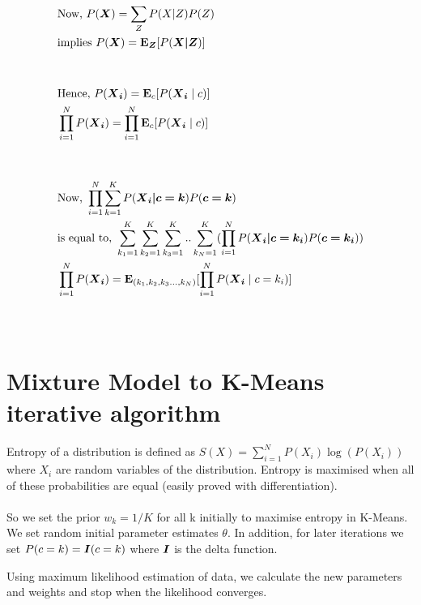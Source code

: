 \documentclass[12pt]{article}
\begin{document}
\begin{gather*}
\begin{aligned}
    & \text{Now, }P(\bm{X}) = \sum_Z{P(X|Z) P(Z)} \\ 
    & \text{implies } P(\bm{X}) = {\bf E}_{\bm{Z}}[P(\bm{X|Z})] \\ \\ \\
    & \text{Hence, } P(\bm{{\boldsymbol X}_{i}}) = {\bf E}_{c}[P(\bm{{\boldsymbol X}_i} \mid c)] \\
    & \prod_{i=1}^{N} P(\bm{{\boldsymbol X}_{i}}) = \prod_{i=1}^{N} {\bf E}_{c} [P(\bm{{\boldsymbol X}_i} \mid c)] \\ \\ \\
    & \text{Now, } \prod_{i=1}^{N} \sum_{k=1}^{K} P(\bm{{\boldsymbol X}_{i} | c = k}) P(\bm{c = k}) \\
    & \text{is equal to, } \sum_{k_1=1}^{K} \sum_{k_2=1}^{K} \sum_{k_3=1}^{K} .. \sum_{k_N=1}^{K} (\prod_{i=1}^{N} P(\bm{{\boldsymbol X}_{i} | c = k_i}) P(\bm{c = k_i})) \\
    & \prod_{i=1}^{N} P(\bm{{\boldsymbol X}_{i}}) = {\bf E}_{(k_1, k_2, k_3..., k_N)}[\prod_{i=1}^{N} P(\bm{{\boldsymbol X}_i} \mid c = k_i)] \\ \\ \\
\end{aligned}
\end{gather*}

\section{Mixture Model to K-Means iterative algorithm}
 
Entropy of a distribution is defined as $S(X) = \sum_{i=1}^{N} P(X_{i})\log(P(X_{i})) $ where $X_{i}$ are random variables of the distribution. Entropy is maximised when all of these probabilities are equal (easily proved with differentiation). 
\\
\\So we set the prior $w_k= 1/K$ for all k initially to maximise entropy in K-Means. We set random initial parameter estimates $\theta$. In addition, for later iterations we set $P(c=k) = {\boldsymbol I}(c=k)$ where ${\boldsymbol I}$ is the delta function.

Using maximum likelihood estimation of data, we calculate the new parameters and weights and stop when the likelihood converges.

\end{document}
